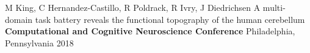 \begin{cventries}
  \cventry
    {M King, C Hernandez-Castillo, R Poldrack, R Ivry, J Diedrichsen} %
    {A multi-domain task battery reveals the functional topography of the human cerebellum} %
    {\textbf{Computational and Cognitive Neuroscience Conference}} %
    {Philadelphia, Pennsylvania} %
    {2018} %
    
    
    
    
    

\end{cventries}

